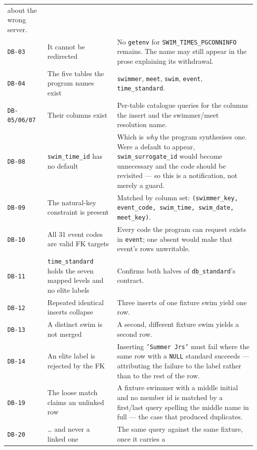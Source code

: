 \documentclass[12pt]{article}
\newcommand{\code}[1]{\texttt{#1}}
\newcommand{\req}[1]{\texttt{#1}}
\begin{document}
\begin{center}
\begin{longtable}{p{2.1cm}p{5.2cm}p{6.2cm}}
      about the wrong server. \\
  \req{DB-03} & It cannot be redirected
    & No \code{getenv} for \code{SWIM\_TIMES\_PGCONNINFO} remains.  The
      name may still appear in the prose explaining its withdrawal. \\
  \req{DB-04} & The five tables the program names exist
    & \code{swimmer}, \code{meet}, \code{swim}, \code{event},
      \code{time\_standard}. \\
  \req{DB-05/06/07} & Their columns exist
    & Per-table catalogue queries for the columns the insert and the
      swimmer/meet resolution name. \\
  \req{DB-08} & \code{swim\_time\_id} has no default
    & Which is \emph{why} the program synthesises one.  Were a default
      to appear, \code{swim\_surrogate\_id} would become unnecessary
      and the code should be revisited --- so this is a notification,
      not merely a guard. \\
  \req{DB-09} & The natural-key constraint is present
    & Matched by column set: \code{(swimmer\_key, event\_code,
      swim\_time, swim\_date, meet\_key)}. \\
  \req{DB-10} & All 31 event codes are valid FK targets
    & Every code the program can request exists in \code{event}; one
      absent would make that event's rows unwritable. \\
  \req{DB-11} & \code{time\_standard} holds the seven mapped levels
      and no elite labels
    & Confirms both halves of \code{db\_standard}'s contract. \\
  \req{DB-12} & Repeated identical inserts collapse
    & Three inserts of one fixture swim yield one row. \\
  \req{DB-13} & A distinct swim is not merged
    & A second, different fixture swim yields a second row. \\
  \req{DB-14} & An elite label is rejected by the FK
    & Inserting \code{'Summer Jrs'} must fail where the same row with
      a \code{NULL} standard succeeds --- attributing the failure to the
      label rather than to the rest of the row. \\
  \req{DB-19} & The loose match claims an unlinked row
    & A fixture swimmer with a middle initial and no member id is
      matched by a first/last query spelling the middle name in full ---
      the case that produced duplicates. \\
  \req{DB-20} & \dots{} and never a linked one
    & The same query against the same fixture, once it carries a

\end{longtable}
\end{center}
\end{document}
